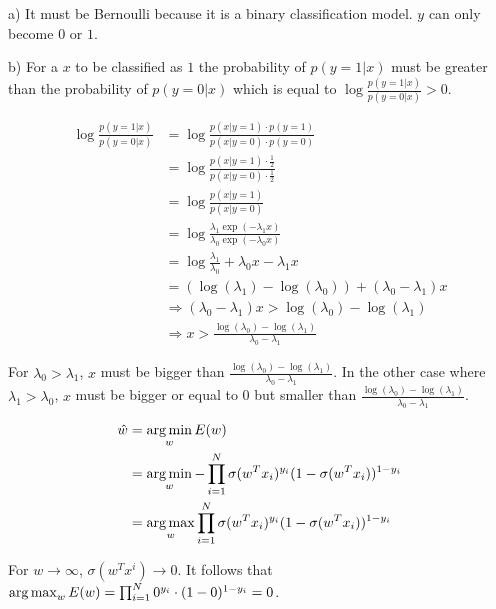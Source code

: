 %
%
%
\begin{flushleft}
a) It must be Bernoulli because it is a binary classification model. $y$ can only become $0$ or $1$.
\end{flushleft}
\begin{flushleft}
b) For a $x$ to be classified as $1$ the probability of $p(y=1|x)$ must be greater than the probability of $p(y=0|x)$ which is equal to $\log \frac{p(y=1|x)}{p(y=0|x)} > 0$.
\end{flushleft}
\begin{align*}
  \log \frac{p(y=1|x)}{p(y=0|x)} &= \log \frac{p(x|y=1)\cdot p(y=1)}{p(x|y=0)\cdot p(y=0)} \\
  &= \log \frac{p(x|y=1)\cdot \frac{1}{2}}{p(x|y=0)\cdot \frac{1}{2}} \\
  &= \log \frac{p(x|y=1)}{p(x|y=0)} \\
  &= \log \frac{\lambda_1 \exp(-\lambda_1 x)}{\lambda_0 \exp(-\lambda_0 x)} \\
  &= \log \frac{\lambda_1}{\lambda_0} + \lambda_0 x - \lambda_1x \\
  &= (\log(\lambda_1) - \log(\lambda_0)) + (\lambda_0 - \lambda_1)x \\
  &\Rightarrow (\lambda_0 - \lambda_1)x > \log(\lambda_0) - \log(\lambda_1) \\
  &\Rightarrow x > \frac{\log(\lambda_0) - \log(\lambda_1)}{\lambda_0 - \lambda_1}
\end{align*}
\begin{flushleft}
For $\lambda_0 > \lambda_1$, $x$ must be bigger than $\frac{\log(\lambda_0) - \log(\lambda_1)}{\lambda_0 - \lambda_1}$. In the other case where $\lambda_1 > \lambda_0$, $x$ must be bigger or equal to 0 but smaller than $\frac{\log(\lambda_0) - \log(\lambda_1)}{\lambda_0 - \lambda_1}$.
\end{flushleft}
%
%
\begin{align*}
  \hat{w} &= \operatorname*{arg\,min}_w E(w) \\
  &= \operatorname*{arg\,min}_w -\prod_{i=1}^N \sigma(w^T x_i)^{y_i} (1-\sigma(w^T x_i))^{1-y_i} \\
  &= \operatorname*{arg\,max}_w \prod_{i=1}^N \sigma(w^T x_i)^{y_i} (1-\sigma(w^T x_i))^{1-y_i} \\
\end{align*}
\begin{flushleft}
For $w \longrightarrow \infty$, $\sigma(w^T x^i) \longrightarrow 0$. It follows that $\operatorname*{arg\,max}_w E(w) = \prod_{i=1}^N 0^{y_i} \cdot (1-0)^{1-y_i} = 0$.
\end{flushleft}
